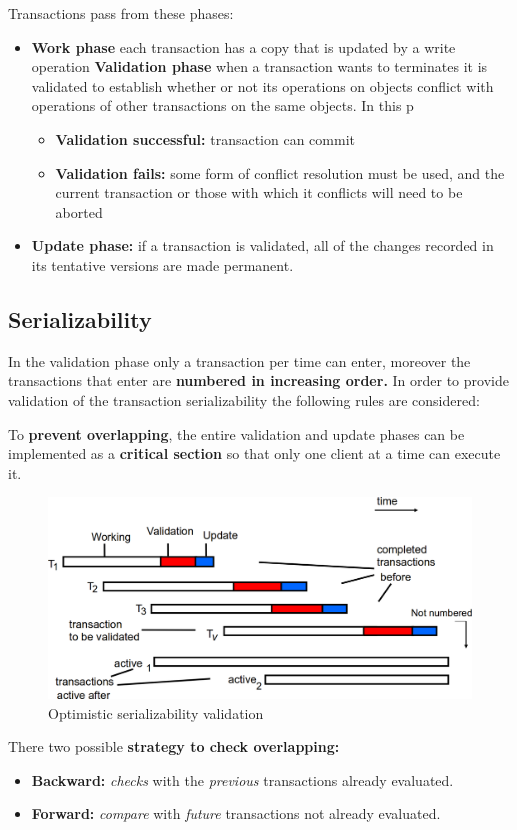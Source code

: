 Transactions pass from these phases:
\begin{itemize}
    \item \textbf{Work phase} each transaction has a copy that is updated by a write operation
    \textbf{Validation phase} when a transaction wants to terminates it is validated to establish whether or not its operations on objects conflict with operations of other transactions on the same objects. In this p
    \begin{itemize}
        \item \textbf{Validation successful:} transaction can commit
        \item \textbf{Validation fails:} some form of conflict resolution must be used, and the current transaction or those with which it conflicts will need to be aborted
    \end{itemize}
    \item \textbf{Update phase:} if a transaction is validated, all of the changes recorded in its tentative versions are made permanent.
\end{itemize}

\subsection{Serializability}
In the validation phase only a transaction per time can enter, moreover the transactions that enter are \textbf{numbered in increasing order.} In order to provide validation of the transaction serializability the following rules are considered:


To \textbf{prevent overlapping}, the entire validation and update phases can be implemented as a \textbf{critical section} so that only one client at a time can execute it.

\begin{figure}[!h]
    \centering
    \includegraphics[width=.80\linewidth]{images/TransactionAndConcurrencyControl/optimisticSerializability.png}
    \caption{Optimistic serializability validation}
\end{figure}
\newpage
There two possible \textbf{strategy to check overlapping:}
\begin{itemize}
    \item \textbf{Backward:} \textit{checks} with the \textit{previous} transactions already evaluated.
    \item \textbf{Forward:} \textit{compare} with \textit{future} transactions not already evaluated.
\end{itemize}

